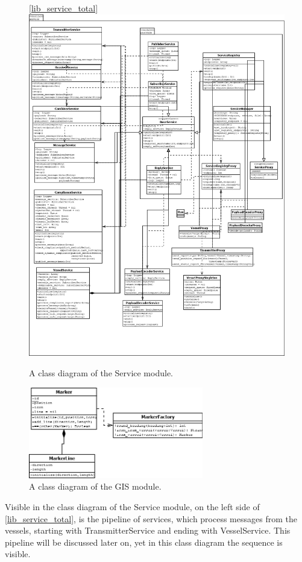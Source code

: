 \documentclass[12pt]{article}
\begin{document}
\begin{figure}
  \ref{lib_service_total}
  \centering
  \includegraphics[width=5in]{lib_service_total}
  \caption[The Service module]
   {A class diagram of the Service module.}
\end{figure}

\begin{figure}
  \label{lib_gis_total}
  \centering
  \includegraphics[width=3in]{lib_gis_total}
  \caption[The GIS module]
   {A class diagram of the GIS module.}
\end{figure}

Visible in the class diagram of the Service module, on the left side of \ref{lib_service_total}, is the pipeline of services, which process messages from the vessels, starting with TransmitterService and ending with VesselService. This pipeline will be discussed later on, yet in this class diagram the sequence is visible.
\end{document}
